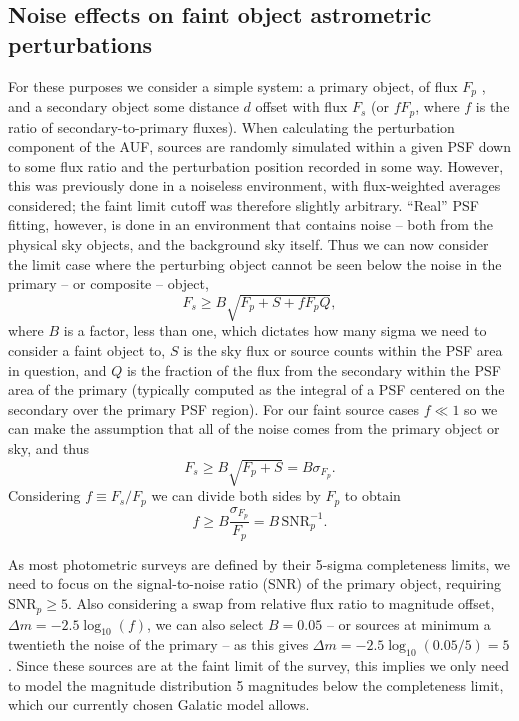 \documentclass[fleqn,usenatbib]{mnras}
\begin{document}
\subsection{Noise effects on faint object astrometric perturbations}
For these purposes we consider a simple system: a primary object, of flux $F_p$ , and a secondary object some distance $d$ offset with flux $F_s$ (or $f F_p$, where $f$ is the ratio of secondary-to-primary fluxes). When calculating the perturbation component of the AUF, sources are randomly simulated within a given PSF down to some flux ratio and the perturbation position recorded in some way. However, this was previously done in a noiseless environment, with flux-weighted averages considered; the faint limit cutoff was therefore slightly arbitrary. ``Real'' PSF fitting, however, is done in an environment that contains noise -- both from the physical sky objects, and the background sky itself. Thus we can now consider the limit case where the perturbing object cannot be seen below the noise in the primary -- or composite -- object,
\begin{equation}
    F_s \geq B\sqrt{F_p + S + fF_pQ},
\end{equation}
where $B$ is a factor, less than one, which dictates how many sigma we need to consider a faint object to, $S$ is the sky flux or source counts within the PSF area in question, and $Q$ is the fraction of the flux from the secondary within the PSF area of the primary (typically computed as the integral of a PSF centered on the secondary over the primary PSF region). For our faint source cases $f \ll 1$ so we can make the assumption that all of the noise comes from the primary object or sky, and thus
\begin{equation}
    F_s \geq B\sqrt{F_p + S} = B\sigma_{F_p}.
\end{equation}
Considering $f \equiv F_s/F_p$ we can divide both sides by $F_p$ to obtain
\begin{equation}
    f \geq B\frac{\sigma_{F_p}}{F_p} = B\,\mathrm{SNR}_p^{-1}.
\end{equation}

As most photometric surveys are defined by their 5-sigma completeness limits, we need to focus on the signal-to-noise ratio (SNR) of the primary object, requiring $\mathrm{SNR}_p \geq 5$. Also considering a swap from relative flux ratio to magnitude offset, $\Delta m = -2.5 \log_{10}(f)$, we can also select $B=0.05$ -- or sources at minimum a twentieth the noise of the primary -- as this gives $\Delta m = -2.5 \log_{10}(0.05/5) = 5$. 
Since these sources are at the faint limit of the survey, this implies we only need to model the magnitude distribution 5 magnitudes below the completeness limit, which our currently chosen Galatic model allows. 
\end{document}
